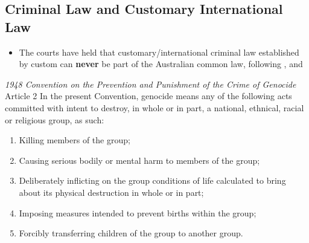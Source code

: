 \subsection{Criminal Law and Customary International Law}
\begin{itemize}
    \item The courts have held that customary/international criminal law established by custom can \textbf{never} be part of the Australian common law, following , and 
\end{itemize}

\begin{conventiondetails}{\textit{1948 Convention on the Prevention and Punishment of the Crime of Genocide} Article 2}
    \flushleft
    In the present Convention, genocide means any of the following acts committed with intent to destroy, in whole or in part, a national, ethnical, racial or religious group, as such: 
    \begin{enumerate}[label=(\alph*)]
        \item Killing members of the group; 
        \item Causing serious bodily or mental harm to members of the group; 
        \item Deliberately inflicting on the group conditions of life calculated to bring about its physical destruction in whole or in part; 
        \item Imposing measures intended to prevent births within the group; 
        \item Forcibly transferring children of the group to another group.
    \end{enumerate}
\end{conventiondetails}

